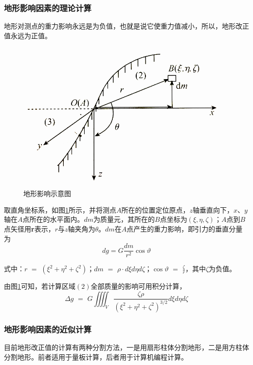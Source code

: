 \subsubsection{地形影响因素的理论计算}
地形对测点的重力影响永远是为负值，也就是说它使重力值减小，所以，地形改正值永远为正值。
\begin{figure}
	\centering
	\label{dixingyingxiangshiyitu}
	\includegraphics[scale = 0.7]{figures/dixingjiaozhengyuanli1.png}
	\caption{地形影响示意图}
\end{figure}

取直角坐标系，如图\ref{dixingyingxiangshiyitu}所示，并将测点$A$所在的位置定位原点，$z$轴垂直向下，$x$、$y$轴在$A$点所在的水平面内。$dm$为质量元，其所在的$B$点坐标为$\left( \xi ,\eta ,\zeta \right) $；$A$点到$B$点矢径用\textbf{r}表示，$r$与$z$轴夹角为$\theta$。$dm$在$A$点产生的重力影响，即引力的垂直分量为
\begin{equation}
	dg=G\frac{dm}{r^2}\cos \vartheta 
\end{equation}

式中：$r\,\,=\,\,\left( \xi ^2+\eta ^2+\zeta ^2 \right)$；$dm\,\,=\,\,\rho \cdot d\xi d\eta d\zeta $；$\cos \vartheta \,\,=\,\,\frac{\zeta}{r}$，其中$\zeta$为负值。

由图\ref{dixingyingxiangshiyitu}可知，若计算区域$\left( 2 \right)$全部质量的影响可用积分计算，
\begin{equation}
	\varDelta g\,\,=\,\,G\iiiint_V{\frac{\zeta \rho}{\left( \xi ^2+\eta ^2+\zeta ^2 \right) ^{\text{3/}2}}d\xi d\eta d\zeta}
\end{equation}
\subsubsection{地形影响因素的近似计算}
目前地形改正值的计算有两种分割方法，一是用扇形柱体分割地形，二是用方柱体分割地形。前者适用于量板计算，后者用于计算机编程计算。

